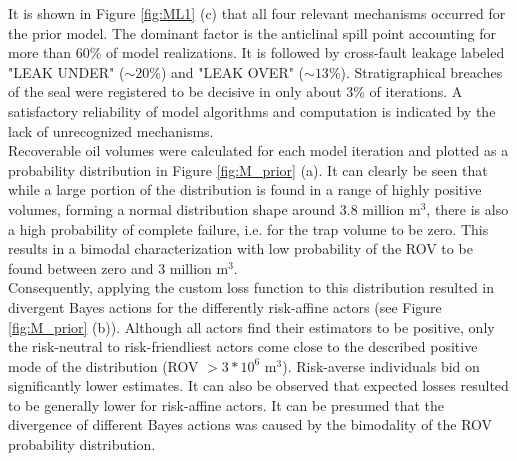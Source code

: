 		It is shown in Figure \ref{fig:ML1} (c) that all four relevant mechanisms occurred for the prior model. The dominant factor is the anticlinal spill point accounting for more than 60\% of model realizations. It is followed by cross-fault leakage labeled "LEAK UNDER" ($\sim20\%$) and "LEAK OVER" ($\sim13\%$). Stratigraphical breaches of the seal were registered to be decisive in only about 3\% of iterations. A satisfactory reliability of model algorithms and computation is indicated by the lack of unrecognized mechanisms.\\
		Recoverable oil volumes were calculated for each model iteration and plotted as a probability distribution in Figure \ref{fig:M_prior} (a). It can clearly be seen that while a large portion of the distribution is found in a range of highly positive volumes, forming a normal distribution shape around 3.8 million m$^3$, there is also a high probability of complete failure, i.e. for the trap volume to be zero. This results in a bimodal characterization with low probability of the ROV to be found between zero and 3 million m$^3$.\\
		Consequently, applying the custom loss function to this distribution resulted in divergent Bayes actions for the differently risk-affine actors (see Figure \ref{fig:M_prior} (b)). Although all actors find their estimators to be positive, only the risk-neutral to risk-friendliest actors come close to the described positive mode of the distribution (ROV $> 3*10^6$ m$^3$). Risk-averse individuals bid on significantly lower estimates. It can also be observed that expected losses resulted to be generally lower for risk-affine actors. It can be presumed that the divergence of different Bayes actions was caused by the bimodality of the ROV probability distribution.
		
